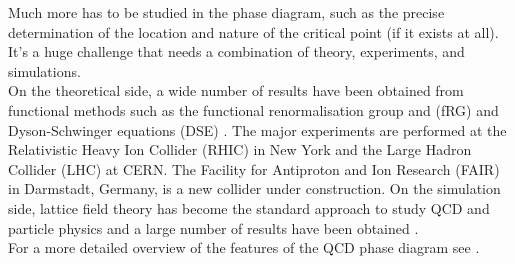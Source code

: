 Much more has to be studied in the phase diagram, such as the precise determination of the location and nature of the critical point (if it exists at all). It's a huge challenge that needs a combination of theory, experiments, and simulations. \\
On the theoretical side, a wide number of results have been obtained from functional methods such as the functional renormalisation group and (fRG) and Dyson-Schwinger equations (DSE) \cite{QCDphase,QCDphase2,Gao_2021}.
The major experiments are performed at the Relativistic Heavy Ion Collider (RHIC) in New York and the Large Hadron
Collider (LHC) at CERN. The Facility for Antiproton and Ion Research (FAIR) in Darmstadt, Germany, is a new collider under construction. On the simulation side, lattice field theory has become the standard approach to study QCD and particle physics and a large number of results have been obtained \cite{wuppertal,201915,Endroedi_2014}. \\
For a more detailed overview of the features of the QCD phase diagram see \cite{phasediag1,Bellwied2015}.
